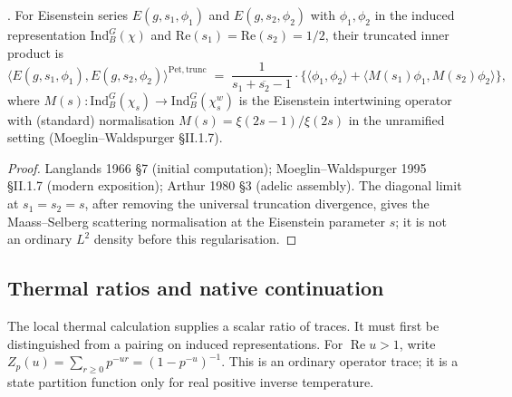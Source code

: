 \begin{lemma}
\label{v4-arith:kms-gns:lem:maass-selberg}
\ClaimStatusProvedElsewhere. For Eisenstein series
\(E(g,s_{1},\phi_{1})\) and \(E(g,s_{2},\phi_{2})\) with
\(\phi_{1},\phi_{2}\) in the induced representation
\(\mathrm{Ind}_{B}^{G}(\chi)\) and \(\mathrm{Re}(s_{1})=\mathrm{Re}(s_{2})=1/2\),
their truncated inner product is
\begin{equation}
\label{v4-arith:kms-gns:eq:maass-selberg}
\bigl\langle E(g,s_{1},\phi_{1}),E(g,s_{2},\phi_{2})\bigr\rangle^{\mathrm{Pet},\mathrm{trunc}}\;=\;\frac{1}{s_{1}+\overline{s_{2}}-1}\cdot\bigl\{\bigl\langle\phi_{1},\phi_{2}\bigr\rangle+\bigl\langle M(s_{1})\phi_{1},M(s_{2})\phi_{2}\bigr\rangle\bigr\},
\end{equation}
where \(M(s)\colon\mathrm{Ind}_{B}^{G}(\chi_{s})\to\mathrm{Ind}_{B}^{G}(\chi_{s}^{w})\)
is the Eisenstein intertwining operator with (standard) normalisation
\(M(s)=\xi(2s-1)/\xi(2s)\) in the unramified setting (Moeglin--Waldspurger
\S II.1.7).
\end{lemma}

\begin{proof}
Langlands 1966 \S7 (initial computation); Moeglin--Waldspurger 1995
\S II.1.7 (modern exposition); Arthur 1980 \S3 (adelic assembly).
The diagonal limit at \(s_{1}=s_{2}=s\), after removing the universal
truncation divergence, gives the Maass--Selberg scattering
normalisation at the Eisenstein parameter \(s\); it is not an ordinary
\(L^{2}\) density before this regularisation.
\end{proof}

\subsection{Thermal ratios and native continuation}
\label{v4-arith:kms-gns:cycle4:koszul-continuation}

The local thermal calculation supplies a scalar ratio of traces. It
must first be distinguished from a pairing on induced representations.
For \(\operatorname{Re}u>1\), write
\(Z_p(u)=\sum_{r\ge0}p^{-ur}=(1-p^{-u})^{-1}\). This is an ordinary
operator trace; it is a state partition function only for real positive
inverse temperature.

